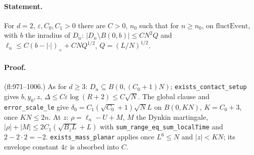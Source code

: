 \paragraph{Statement.} For $d=2$, $\varepsilon,C_0,C_1>0$ there are $C>0$, $n_0$ such that for $n\geq n_0$, on $\mathrm{fluctEvent}$, with $b$ the inradius of $D_n$:
$|D_n\setminus B(0,b)|\leq CN^2Q$ and $\ell_n\leq C(b-|\cdot|)_++CNQ^{1/2}$, $Q=(L/N)^{1/2}$.
\paragraph{Proof.} (fl:971--1006.) As for $d\geq3$: $D_n\subseteq B(0,(C_0+1)N)$; \texttt{exists\_contact\_setup} gives $b,y_0,z$, $\Delta\leq C\varepsilon\log(R+2)\leq C\sqrt N$.
The global clause and \texttt{error\_scale\_le} give $\delta_0=C_1(\sqrt{C_0}+1)\sqrt NL$ on $B(0,KN)$, $K=C_0+3$, once $KN\leq2n$. At $z$: $\rho=\ell_n-U+M$, $M$ the Dynkin
martingale, $|\rho|+|M|\leq2C_1(\sqrt{B_zL}+L)$ with \texttt{sum\_range\_eq\_sum\_localTime} and $2-2\cdot2=-2$. \texttt{exists\_mass\_planar} applies once $L^6\leq N$ and $|z|<KN$;
its envelope constant $4\varepsilon$ is absorbed into $C$.
